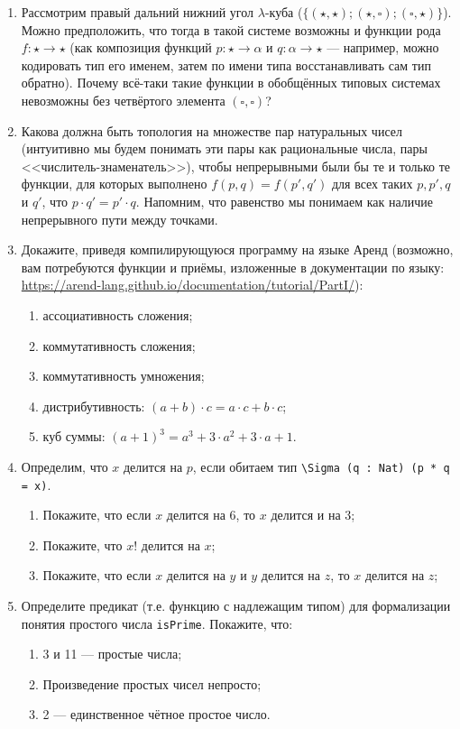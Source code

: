 \documentclass[10pt,a4paper,oneside]{article}
\begin{document}
\begin{enumerate}
\item Рассмотрим правый дальний нижний угол $\lambda$-куба ($\{(\star,\star);(\star,\square);(\square,\star)\}$).
Можно предположить, что тогда в такой системе возможны и функции рода $f: \star\rightarrow\star$ 
(как композиция функций $p: \star\rightarrow\alpha$ и $q: \alpha\rightarrow\star$ ---
например, можно кодировать тип его именем, затем по имени типа восстанавливать сам тип обратно).
Почему всё-таки такие функции в обобщённых типовых системах невозможны без четвёртого элемента $(\square,\square)$?

\item Какова должна быть топология на множестве
пар натуральных чисел (интуитивно мы будем понимать эти пары как рациональные числа, пары <<числитель-знаменатель>>), 
чтобы непрерывными были бы те и только те функции, для которых выполнено $f(p,q) = f(p',q')$ для всех 
таких $p,p',q$ и $q'$, что $p\cdot q' = p'\cdot q$. Напомним, что равенство мы понимаем как наличие непрерывного пути 
между точками.

\item Докажите, приведя компилирующуюся программу на языке Аренд (возможно, вам потребуются функции и приёмы, 
изложенные в документации по языку: \url{https://arend-lang.github.io/documentation/tutorial/PartI/}):
\begin{enumerate}
\item ассоциативность сложения;
\item коммутативность сложения;
\item коммутативность умножения;
\item дистрибутивность: $(a + b)\cdot c = a\cdot c + b \cdot c$;
\item куб суммы: $(a + 1)^3 = a^3 + 3\cdot a^2 + 3 \cdot a + 1$.
\end{enumerate}

\item Определим, что $x$ делится на $p$, если обитаем тип \verb!\Sigma (q : Nat) (p * q = x)!.
\begin{enumerate}
\item Покажите, что если $x$ делится на 6, то $x$ делится и на 3;
\item Покажите, что $x!$ делится на $x$;
\item Покажите, что если $x$ делится на $y$ и $y$ делится на $z$, то $x$ делится на $z$;
\end{enumerate}

\item Определите предикат (т.е. функцию с надлежащим типом) для формализации понятия простого числа \verb!isPrime!.
Покажите, что:
\begin{enumerate}
\item 3 и 11 --- простые числа;
\item Произведение простых чисел непросто;
\item 2 --- единственное чётное простое число.
\end{enumerate}


\end{enumerate}
\end{document}
